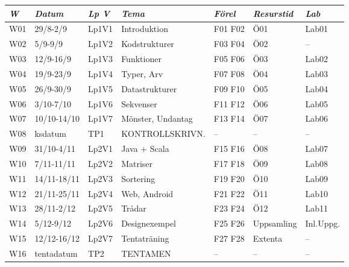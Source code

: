 \begin{tabular}{l|l|l|l|l|l|l}
\textit{W} & \textit{Datum} & \textit{Lp V} & \textit{Tema} & \textit{Förel} & \textit{Resurstid} & \textit{Lab} \\ \hline \hline
W01 & 29/8-2/9    & Lp1V1 & Introduktion      & F01 F02 & Ö01        & Lab01     \\
W02 & 5/9-9/9     & Lp1V2 & Kodstrukturer     & F03 F04 & Ö02        & --        \\
W03 & 12/9-16/9   & Lp1V3 & Funktioner        & F05 F06 & Ö03        & Lab02     \\
W04 & 19/9-23/9   & Lp1V4 & Typer, Arv        & F07 F08 & Ö04        & Lab03     \\
W05 & 26/9-30/9   & Lp1V5 & Datastrukturer    & F09 F10 & Ö05        & Lab04     \\
W06 & 3/10-7/10   & Lp1V6 & Sekvenser         & F11 F12 & Ö06        & Lab05     \\
W07 & 10/10-14/10 & Lp1V7 & Mönster, Undantag & F13 F14 & Ö07        & Lab06     \\
W08 & ksdatum     & TP1   & KONTROLLSKRIVN.   & --      & --         & --        \\
W09 & 31/10-4/11  & Lp2V1 & Java + Scala      & F15 F16 & Ö08        & Lab07     \\
W10 & 7/11-11/11  & Lp2V2 & Matriser          & F17 F18 & Ö09        & Lab08     \\
W11 & 14/11-18/11 & Lp2V3 & Sortering         & F19 F20 & Ö10        & Lab09     \\
W12 & 21/11-25/11 & Lp2V4 & Web, Android      & F21 F22 & Ö11        & Lab10     \\
W13 & 28/11-2/12  & Lp2V5 & Trådar            & F23 F24 & Ö12        & Lab11     \\
W14 & 5/12-9/12   & Lp2V6 & Designexempel     & F25 F26 & Uppsamling & Inl.Uppg. \\
W15 & 12/12-16/12 & Lp2V7 & Tentaträning      & F27 F28 & Extenta    & --        \\
W16 & tentadatum  & TP2   & TENTAMEN          & --      & --         & --        \\
\end{tabular}
